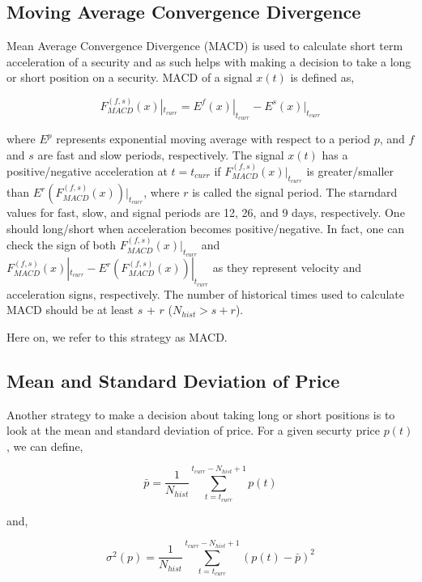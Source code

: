 \documentclass{article}
\begin{document}
\subsection{Moving Average Convergence Divergence}\label{section:macd}

Mean Average Convergence Divergence (MACD) is used to calculate short
term acceleration of a security and as such helps with making a
decision to take a long or short position on a security. MACD of a
signal $x(t)$ is defined as,

\begin{equation}\label{eqn:macd}
F_{MACD}^{(f,s)}(x)|_{t_{curr}} = E^{f}(x)|_{t_{curr}} -
E^{s}(x)|_{t_{curr}}
\end{equation}

where $E^{p}$ represents exponential moving average with respect to a
period $p$, and $f$ and $s$ are fast and slow periods,
respectively. The signal $x(t)$ has a positive/negative acceleration
at $t=t_{curr}$ if $F_{MACD}^{(f,s)}(x)|_{t_{curr}}$ is
greater/smaller than $E^{r}(F_{MACD}^{(f,s)}(x))|_{t_{curr}}$, where
$r$ is called the signal period. The starndard values for fast, slow,
and signal periods are 12, 26, and 9 days, respectively. One should
long/short when acceleration becomes positive/negative. In fact, one
can check the sign of both $F_{MACD}^{(f,s)}(x)|_{t_{curr}}$ and
$F_{MACD}^{(f,s)}(x)|_{t_{curr}}-E^{r}(F_{MACD}^{(f,s)}(x))|_{t_{curr}}$
as they represent velocity and acceleration signs, respectively. The
number of historical times used to calculate MACD should be at least
$s$ + $r$ ($N_{hist} > s + r$).

Here on, we refer to this strategy as MACD.

\subsection{Mean and Standard Deviation of Price}\label{section:msdp}

Another strategy to make a decision about taking long or short
positions is to look at the mean and standard deviation of price. For
a given securty price $p(t)$, we can define,

\begin{equation}\label{eqn:mean-price}
\bar{p} = \frac{1}{N_{hist}} \sum_{t=t_{curr}}^{t_{curr}-N_{hist}+1} p(t)
\end{equation}

and,

\begin{equation}\label{eqn:std-price}
\sigma^{2}(p) = \frac{1}{N_{hist}} \sum_{t=t_{curr}}^{t_{curr}-N_{hist}+1} (p(t) - \bar{p} )^{2}
\end{equation}
\end{document}
